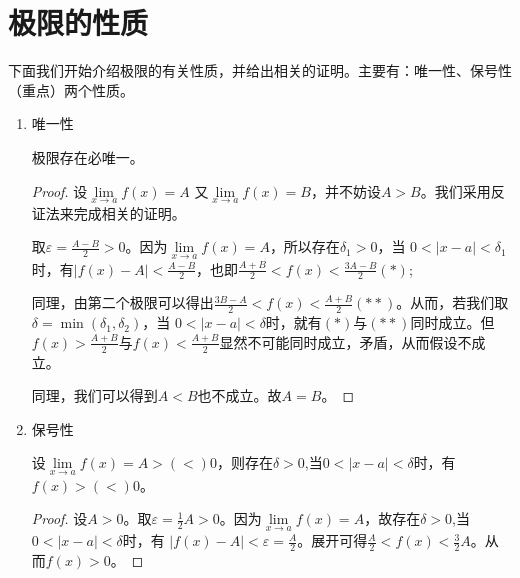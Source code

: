 \documentclass[cn,12pt,chinese]{elegantbook}
\begin{document}
\section{极限的性质}
下面我们开始介绍极限的有关性质，并给出相关的证明。主要有：唯一性、保号性（重点）两个性质。
\begin{enumerate}
    \item 唯一性
    \begin{property}
        极限存在必唯一。
    \end{property}
    
    \begin{proof}
    设$\lim\limits_{x \to a}f(x)=A $
    又$ \lim\limits_{x \to a}f(x)=B $，并不妨设$A>B$。我们采用反证法来完成相关的证明。
    
    取$ \varepsilon=\displaystyle\frac{A-B}{2}>0 $。因为$\lim\limits_{x \to a}f(x)=A $，所以存在$\delta_1>0 $，当 $0<\vert x-a\vert <\delta_1 $时，有$\vert{f(x)-A}\vert<\displaystyle\frac{A-B}{2}$，也即$\displaystyle\frac{A+B}{2}<f(x)<\frac{3A-B}{2}(*)$; 
    
    
    同理，由第二个极限可以得出$\displaystyle\frac{3B-A}{2}<f(x)<\displaystyle\frac{A+B}{2}(**)$。从而，若我们取$\delta=\min{(\delta_1,\delta_2)}$，当
    $ 0<\vert x-a\vert <\delta $时，就有$(*)$与$(**)$同时成立。但$f(x)>\displaystyle\frac{A+B}{2}$与$f(x)<\displaystyle\frac{A+B}{2}$显然不可能同时成立，矛盾，从而假设不成立。
    
    同理，我们可以得到$A<B$也不成立。故$A=B$。
    \end{proof}
    
    \item \FiveStar 保号性
    \begin{property}
        设$\lim\limits_{x \to a}f(x)=A>(<)0$，则存在$ \delta>0 $,当$ 0<\vert x-a\vert <\delta $时，有$f(x)>(<)0$。
    \end{property}
    \begin{proof}
        设$A>0$。取$\varepsilon=\displaystyle\frac{1}{2}A>0$。因为$\lim\limits_{x \to a}f(x)=A$，故存在$ \delta>0 $,当$ 0<\vert x-a\vert <\delta $时，有 $\vert{f(x)-A}\vert<\varepsilon=\displaystyle\frac{A}{2}$。展开可得$\displaystyle\frac{A}{2}<f(x)<\displaystyle\frac{3}{2}A$。从而$f(x)>0$。
    \end{proof}
\end{enumerate}
\end{document}
